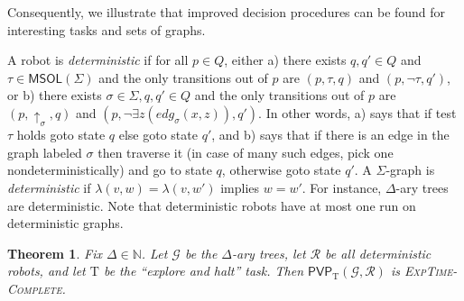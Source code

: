 \documentclass{aamas2015}
\newtheorem{thm}{Theorem}
\def\exptimeC{\textsc{ExpTime-Complete}}
\def\gclass{\mathcal{G}}
\def\rclass{\mathcal{R}}
\def\T{\mathrm{T}}
\def\nat{\mathbb{N}}
\def\PVP{\mathsf{PVP}}
\def\msol{\mathsf{MSOL}}
\newcommand{\sr}[1]{\footnote{{\color{red} Note. #1}}}
\begin{document}
Consequently, we illustrate that improved decision procedures can be found for interesting tasks and sets of graphs.
%
%
%

A robot is {\em deterministic} if for all $p \in Q$, either a)  there exists $q,q' \in Q$ and $\tau \in \msol(\Sigma)$ and the only transitions out of $p$ are $(p,\tau,q)$ and $(p,\neg \tau,q')$, or b) there exists $\sigma \in \Sigma, q,q' \in Q$ and the only transitions out of $p$ are $(p,\uparrow_\sigma,q)$ and $(p,\neg \exists z (edg_\sigma(x,z)),q')$. In other words, a) says that if test $\tau$ holds goto state $q$ else goto state $q'$, and b) says that if there is an edge in the graph labeled $\sigma$ then traverse it (in case of many such edges, pick one nondeterministically) and go to state $q$, otherwise goto state $q'$. 
A $\Sigma$-graph is {\em deterministic} if $\lambda(v,w) = \lambda(v,w')$ implies $w = w'$. For instance, $\Delta$-ary trees are deterministic. Note that deterministic robots have at most one run on deterministic graphs.

\begin{thm}  \label{thm:exptime}
Fix $\Delta \in \nat$. Let $\gclass$ be the $\Delta$-ary trees, let $\rclass$ be all deterministic robots, and let $\T$  be the ``explore and halt'' task. Then $\PVP_\T(\gclass,\rclass)$ is \exptimeC. 
\end{thm}

\end{document}
